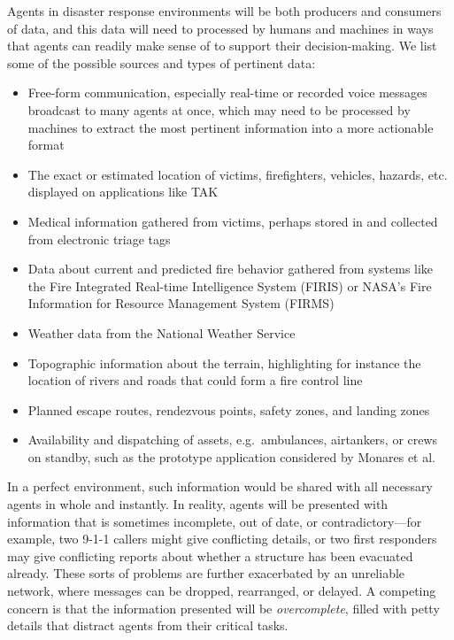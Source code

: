 \documentclass[]             %
{NASA}                       %
\theoremstyle{definition}
\begin{document}
Agents in disaster response environments will be both producers and
consumers of data, and this data will need to processed by humans and
machines in ways that agents can readily make sense of to support
their decision-making. We list some of the possible sources and
types of pertinent data:
\begin{itemize}
\item Free-form communication, especially real-time or recorded voice messages
  broadcast to many agents at once, which may need to be processed by
  machines to extract the most pertinent information into a more
  actionable format
\item The exact or estimated location of victims, firefighters,
  vehicles, hazards, etc. displayed on applications like TAK
\item Medical information gathered from victims, perhaps stored in and
  collected from electronic triage tags \cite{2009:triagetag}
\item Data about current and predicted fire behavior gathered from
  systems like the Fire Integrated Real-time Intelligence System
  (FIRIS) or NASA's Fire Information for Resource Management System
  (FIRMS)
\item Weather data from the National Weather Service
\item Topographic information about the terrain, highlighting for
  instance the location of rivers and roads that could form a fire
  control line
\item Planned escape routes, rendezvous points, safety zones, and
  landing zones
\item Availability and dispatching of assets, e.g.~ambulances,
  airtankers, or crews on standby, such as the prototype application
  considered by Monares et al. \cite{2011:monares}
\end{itemize}
In a perfect environment, such information would be shared with all
necessary agents in whole and instantly. In reality, agents will be
presented with information that is sometimes incomplete, out of date,
or contradictory---for example, two 9-1-1 callers might give conflicting details, or two first responders may give conflicting reports about whether a structure has been evacuated already. These sorts of problems are further exacerbated by an
unreliable network, where messages can be dropped, rearranged, or delayed. A competing concern is that the information
presented will be \emph{overcomplete}, filled with petty details that
distract agents from their critical tasks.
\end{document}
